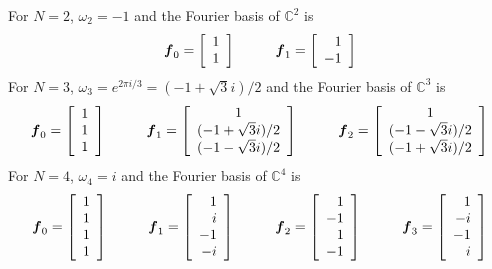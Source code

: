 \begin{example}
For $N=2$, $\omega_2 = -1$ and the Fourier basis of $\mathbb{C}^2$ is
$$
\bs{f}_0 = \left[ \begin{array}{r} 1 \\ 1 \end{array} \right]
\hspace{10mm}
\bs{f}_1 = \left[ \begin{array}{r} 1 \\ -1 \end{array} \right]
$$
For $N=3$, $\omega_3 = e^{2 \pi i/3} = (-1 + \sqrt{3}i)/2$ and the Fourier basis of $\mathbb{C}^3$ is
$$
\bs{f}_0 = \left[ \begin{array}{r} 1 \\ 1 \\ 1 \end{array} \right]
\hspace{10mm}
\bs{f}_1 = \left[ \begin{array}{c} 1 \\ (-1 + \sqrt{3}i)/2 \\ (-1 - \sqrt{3}i)/2 \end{array} \right]
\hspace{10mm}
\bs{f}_2 = \left[ \begin{array}{c} 1 \\ (-1 - \sqrt{3}i)/2 \\ (-1 + \sqrt{3}i)/2 \end{array} \right]
$$
For $N=4$, $\omega_4 = i$ and the Fourier basis of $\mathbb{C}^4$ is
$$
\bs{f}_0 = \left[ \begin{array}{r} 1 \\ 1 \\ 1 \\ 1 \end{array} \right]
\hspace{10mm}
\bs{f}_1 = \left[ \begin{array}{r} 1 \\ i \\ -1 \\ -i \end{array} \right]
\hspace{10mm}
\bs{f}_2 = \left[ \begin{array}{r} 1 \\ -1 \\ 1 \\ -1 \end{array} \right]
\hspace{10mm}
\bs{f}_3 = \left[ \begin{array}{r} 1 \\ -i \\ -1 \\ i \end{array} \right]
$$
\end{example}


